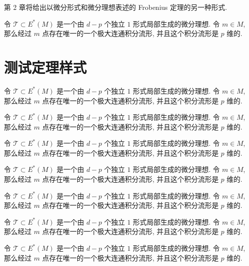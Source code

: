 \begin{remark}
第 2 章将给出以微分形式和微分理想表述的 Frobenius 定理的另一种形式. 
\end{remark}
\clearpage
\begin{thm}[Frobenius定理用微分形式与微分理想表示的形式]
    令 $\mathscr{T} \subset E^*(M)$ 是一个由 $d-p$ 个独立 $1$ 形式局部生成的微分理想. 令 $m \in M$, 那么经过 $m$ 点存在唯一的一个极大连通积分流形, 并且这个积分流形是 $p$ 维的.
\end{thm}
\section{测试定理样式}
\begin{theorem}
    令 $\mathscr{T} \subset E^*(M)$ 是一个由 $d-p$ 个独立 $1$ 形式局部生成的微分理想. 令 $m \in M$, 那么经过 $m$ 点存在唯一的一个极大连通积分流形, 并且这个积分流形是 $p$ 维的.
\end{theorem}

\begin{lemma}
    令 $\mathscr{T} \subset E^*(M)$ 是一个由 $d-p$ 个独立 $1$ 形式局部生成的微分理想. 令 $m \in M$, 那么经过 $m$ 点存在唯一的一个极大连通积分流形, 并且这个积分流形是 $p$ 维的.
\end{lemma}

\begin{definition}
    令 $\mathscr{T} \subset E^*(M)$ 是一个由 $d-p$ 个独立 $1$ 形式局部生成的微分理想. 令 $m \in M$, 那么经过 $m$ 点存在唯一的一个极大连通积分流形, 并且这个积分流形是 $p$ 维的.
\end{definition}

\begin{proposition}
    令 $\mathscr{T} \subset E^*(M)$ 是一个由 $d-p$ 个独立 $1$ 形式局部生成的微分理想. 令 $m \in M$, 那么经过 $m$ 点存在唯一的一个极大连通积分流形, 并且这个积分流形是 $p$ 维的.
\end{proposition}

\begin{example}
    令 $\mathscr{T} \subset E^*(M)$ 是一个由 $d-p$ 个独立 $1$ 形式局部生成的微分理想. 令 $m \in M$, 那么经过 $m$ 点存在唯一的一个极大连通积分流形, 并且这个积分流形是 $p$ 维的.
\end{example}

\begin{corollary}
    令 $\mathscr{T} \subset E^*(M)$ 是一个由 $d-p$ 个独立 $1$ 形式局部生成的微分理想. 令 $m \in M$, 那么经过 $m$ 点存在唯一的一个极大连通积分流形, 并且这个积分流形是 $p$ 维的.
\end{corollary}
\clearpage
\begin{fancybox}
    令 $\mathscr{T} \subset E^*(M)$ 是一个由 $d-p$ 个独立 $1$ 形式局部生成的微分理想. 令 $m \in M$, 那么经过 $m$ 点存在唯一的一个极大连通积分流形, 并且这个积分流形是 $p$ 维的.
\end{fancybox}

